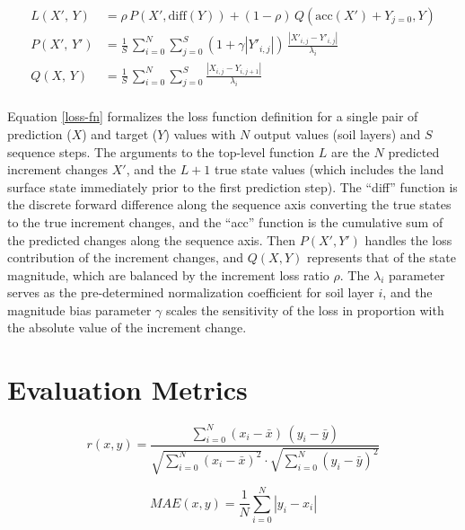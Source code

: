 \begin{equation}\label{loss-fn}
    \begin{split}
        L(X',\,Y) &= \rho\,P(X',\text{diff}(Y)) + (1-\rho)\,Q(\text{acc}(X')+Y_{j=0},Y) \\
        P(X',\,Y') &= \frac{1}{S}\,\sum_{i=0}^N \sum_{j=0}^S (1+\gamma \left|Y'_{i,j}\right|)\,\frac{\left|X'_{i,j}-Y'_{i,j}\right|}{\lambda_i} \\
        Q(X,\,Y) &= \frac{1}{S}\,\sum_{i=0}^N \sum_{j=0}^S \frac{\left|X_{i,j}-Y_{i,j+1}\right|}{\lambda_i}\\
    \end{split}
\end{equation}


Equation \ref{loss-fn} formalizes the loss function definition for a single pair of prediction ($X$) and target ($Y$) values with $N$ output values (soil layers) and $S$ sequence steps. The arguments to the top-level function $L$ are the $N$ predicted increment changes $X'$, and the $L+1$ true state values (which includes the land surface state immediately prior to the first prediction step). The ``diff'' function is the discrete forward difference along the sequence axis converting the true states to the true increment changes, and the ``acc'' function is the cumulative sum of the predicted changes along the sequence axis. Then $P(X',Y')$ handles the loss contribution of the increment changes, and $Q(X,Y)$ represents that of the state magnitude, which are balanced by the increment loss ratio $\rho$. The $\lambda_i$ parameter serves as the pre-determined normalization coefficient for soil layer $i$, and the magnitude bias parameter $\gamma$ scales the sensitivity of the loss in proportion with the absolute value of the increment change.

\section{Evaluation Metrics}

\begin{equation}
    \label{metric_pcc}
    r(x,y) = \frac{\sum_{i=0}^{N}(x_i-\bar{x})\,(y_i - \bar{y})}{\sqrt{\sum_{i=0}^N(x_i - \bar{x})^2} \cdot \sqrt{\sum_{i=0}^N(y_i-\bar{y})^2}}
\end{equation}

\begin{equation}
    \label{metric_mae}
    MAE(x,y) = \frac{1}{N}\sum_{i=0}^{N}\left|y_i-x_i\right|
\end{equation}


